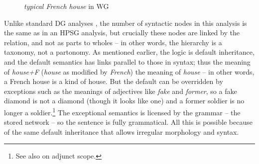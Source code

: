 \documentclass[output=paper,biblatex,babelshorthands,newtxmath,draftmode,colorlinks,citecolor=brown]{langscibook}
\begin{document}
\begin{figure}
	\centering
{}
	\caption{\emph{typical French house} in WG}
	\label{fig:9}
\end{figure}

Unlike standard DG analyses \citep{MuellerEvaluating}, the number of syntactic nodes in this
analysis is the same as in an HPSG analysis, but crucially these nodes are linked by the 
relation, and not as parts to wholes – in other words, the hierarchy is a taxonomy, not a
partonomy. As mentioned earlier, the logic is default inheritance, and the default semantics has
 links parallel to those in syntax; thus the meaning of \emph{house+F} (\emph{house} as
modified by \emph{French})  the meaning of \emph{house} – in other words, a French house is
a kind of house. But the default can be overridden by exceptions such as the meanings of adjectives
like \emph{fake} and \emph{former}, so a fake diamond is not a diamond (though it looks like one)
and a former soldier is no longer a soldier.\footnote{
See also  on adjunct scope.
} The exceptional semantics is licensed by the grammar –
the stored network – so the sentence is fully grammatical. All this is possible because of the same
default inheritance that allows irregular morphology and syntax.
\end{document}
